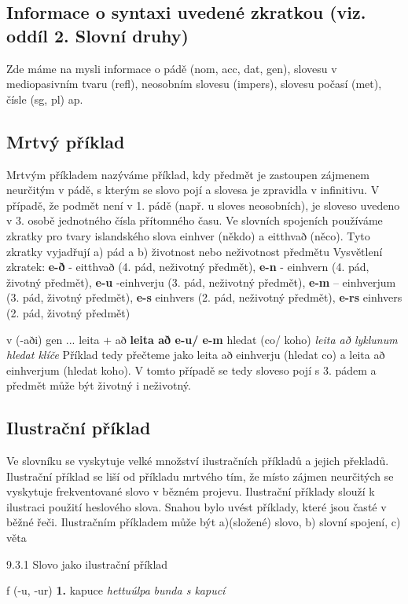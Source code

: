 \subsection{Informace o syntaxi uvedené zkratkou (viz. oddíl 2. Slovní druhy)}
Zde máme na mysli informace o pádě (nom, acc, dat, gen), slovesu v mediopasivním tvaru (refl), neosobním slovesu (impers), slovesu počasí (met), čísle (sg, pl) ap.
\subsection{Mrtvý příklad}
Mrtvým příkladem nazýváme příklad, kdy předmět je zastoupen zájmenem neurčitým v pádě, s kterým se slovo pojí a slovesa je zpravidla v infinitivu. V případě, že podmět není v 1. pádě (např. u sloves neosobních), je sloveso uvedeno v 3. osobě jednotného čísla přítomného času.
Ve slovních spojeních používáme zkratky pro tvary islandského slova einhver (někdo) a eitthvað (něco). Tyto zkratky vyjadřují a) pád a b) životnost nebo neživotnost předmětu
Vysvětlení zkratek: 
\textbf{e-ð}  - eitthvað (4. pád, neživotný předmět), \textbf{e-n}  - einhvern (4. pád, životný předmět), \textbf{e-u} -einhverju (3. pád, neživotný předmět), \textbf{e-m} – einhverjum (3. pád, životný předmět),  \textbf{e-s} einhvers (2. pád, neživotný předmět), \textbf{e-rs} einhvers (2. pád, životný předmět)

 {\small{v (-aði) gen}
...
{\small{leita + að}}
\textbf{leita að e-u/ e-m} {hledat (co/ koho)}
	\textit{
leita að lyklunum} \textit{ hledat klíče  }}
Příklad tedy přečteme jako leita að einhverju (hledat co) a leita að einhverjum (hledat koho). V tomto případě se tedy sloveso pojí s 3. pádem a předmět může být životný i neživotný.

\subsection{Ilustrační příklad}
Ve slovníku se vyskytuje velké množství ilustračních příkladů a jejich překladů. Ilustrační příklad se liší od příkladu mrtvého tím, že místo zájmen neurčitých se vyskytuje frekventované slovo v bězném projevu. Ilustrační příklady slouží k ilustraci použití
heslového slova. Snahou bylo uvést příklady, které jsou časté v běžné řeči.
Ilustračním příkladem může být a)(složené) slovo, b) slovní spojení, c) věta 

9.3.1	 Slovo jako ilustrační příklad 

 {\small{f (-u, -ur)}
\textbf{1. } {kapuce}
\textit{hettuúlpa} \textit{ bunda s kapucí  }}

